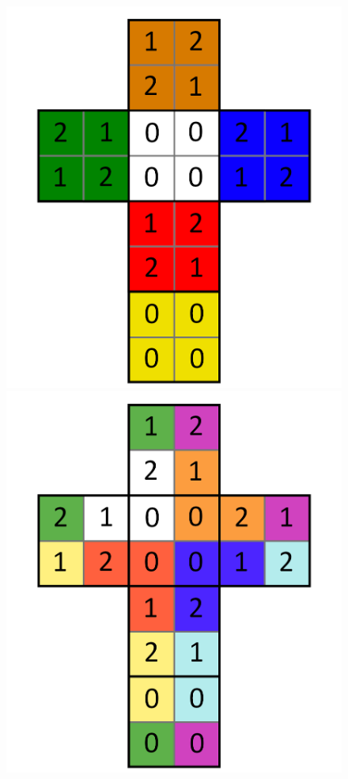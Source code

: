 \documentclass[12pt,a4paper, usenames, dvipsnames]{scrartcl}
\begin{document}
\begin{figure}[H]
\centering
\includegraphics[scale=0.1]{foldedout_012.png}
\includegraphics[scale=0.1]{foldedout_c_012.png}
\end{figure}
\end{document}
